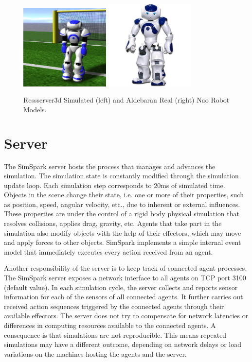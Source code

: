 \begin{figure}[t!]
\centering
  \includegraphics[trim=7cm 0cm 0cm 0cm, clip, width=0.4\textwidth]{Chapter2/figures/629px-Models-nao.jpg}
  \includegraphics[width=0.4\textwidth]{Chapter2/figures/RealNao.jpg}
  \caption{Rcssserver3d Simulated (left) and Aldebaran Real (right) Nao Robot Models.} 
  \label{fig:Naoinsimulationscreen}
\end{figure}

\section{Server}
The SimSpark server hosts the process that manages and advances the simulation. The simulation state is constantly modified through the simulation update loop. Each simulation step corresponds to 20ms of simulated time. Objects in the scene change their state, i.e. one or more of their properties, such as position, speed, angular velocity, etc., due to inherent or external influences. These properties are under the control of a rigid body physical simulation that resolves collisions, applies drag, gravity, etc. Agents that take part in the simulation also modify objects with the help of their effectors, which may move and apply forces to other objects. SimSpark implements a simple internal event model that immediately executes every action received from an agent.


Another responsibility of the server is to keep track of connected agent processes. The SimSpark server exposes a network interface to all agents on TCP port 3100 (default value). In each simulation cycle, the server collects and reports sensor information for each of the sensors of all connected agents. It further carries out received action sequences triggered by the connected agents through their available effectors.
The server does not try to compensate for network latencies or differences in computing resources available to the connected agents. A consequence is that simulations are not reproducible. This means repeated simulations may have a different outcome, depending on network delays or load variations on the machines hosting the agents and the server.


